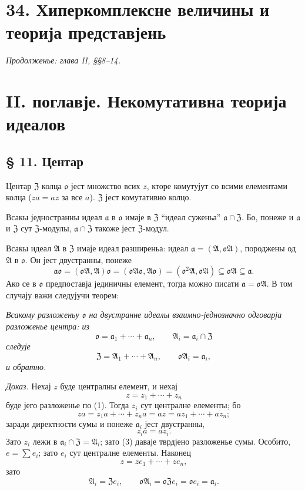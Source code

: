 ﻿\documentclass[11pt]{article}
\providecommand{\ma}{\mathfrak{a}}
\providecommand{\mA}{\mathfrak{A}}
\providecommand{\mZ}{\mathfrak{Z}}
\providecommand{\mo}{\mathfrak{o}}
\begin{document}
\section*{34. Хиперкомплексне величины и теорија представјень}
\emph{Продолженье: глава II, §§8--14.}

\section*{II. поглавје. Некомутативна теорија идеалов}

\subsection*{§ 11. Центар}

Центар $\mZ$ колца $\mo$ јест множство всих $z$, кторе комутујут со всими елементами колца ($za=az$ за все $a$). $\mZ$ јест комутативно колцо.

Всакы једностранны идеал $\ma$ в $\mo$ имаје в $\mZ$ ``идеал суженьа'' $\ma\cap\mZ$. Бо, понеже и $\ma$ и $\mZ$ сут $\mZ$-модулы, $\ma\cap\mZ$ такоже јест $\mZ$-модул.

Всакы идеал $\mA$ в $\mZ$ имаје идеал разширеньа: идеал $\ma=(\mA,\mo\mA)$, породжены од $\mA$ в $\mo$. Он јест двустранны, понеже
\[
        \ma\mo=(\mo\mA,\mA)\mo=(\mo\mA\mo,\mA\mo)
        =(\mo^2\mA,\mo\mA)\subseteq\mo\mA\subseteq\ma.
\]
Ако се в $\mo$ предпоставја јединичны елемент, тогда можно писати $\ma=\mo\mA$. В том случају важи следујучи теорем:

\emph{Всакому разложеньу $\mo$ на двустранне идеалы взаимно-једнозначно одговарја разложенье центра: из}
\begin{equation}
        \mo=\ma_1+\cdots+\ma_n,
        \qquad \mA_i=\ma_i\cap\mZ                         \tag{1}
\end{equation}
\emph{следује}
\begin{equation}
        \mZ=\mA_1+\cdots+\mA_n,
        \qquad \mo\mA_i=\ma_i,                              \tag{2}
\end{equation}
\emph{и обратно.}

\emph{Доказ.} Нехај $z$ буде централны елемент, и нехај
\begin{equation}
        z=z_1+\cdots+z_n                                    \tag{3}
\end{equation}
буде јего разложенье по (1). Тогда $z_i$ сут централне елементы; бо
\[
        za=z_1a+\cdots+z_na=az=az_1+\cdots+az_n;
\]
заради директности сумы и понеже $\ma_i$ јест двустранны,
\[
        z_i a=az_i.
\]
Зато $z_i$ лежи в $\ma_i\cap\mZ=\mA_i$; зато (3) даваје тврдјено разложенье сумы. Особито, $e=\sum e_i$; зато $e_i$ сут централне елементы. Наконец
\[
        z=ze_1+\cdots+ze_n,
\]
зато
\[
        \mA_i=\mZ e_i,
        \qquad
        \mo\mA_i=\mo\mZ e_i=\mo e_i=\ma_i.
\]
\end{document}
